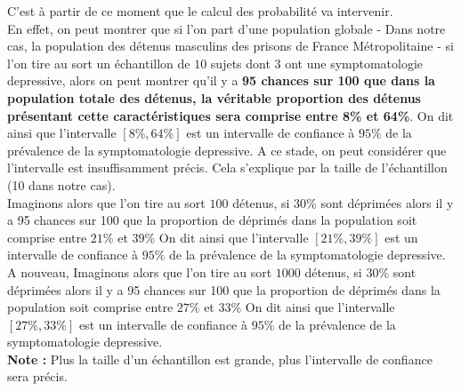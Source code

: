 C'est à partir de ce moment que le calcul des probabilité va intervenir.\newline
\\
En effet, on peut montrer que si l'on part d'une population globale - Dans notre cas, la population des détenus masculins des prisons de France Métropolitaine - si l'on tire au sort un échantillon de $10$ sujets dont $3$ ont une symptomatologie depressive, alors on peut montrer qu'il y a \textbf{95 chances sur 100 que dans la population totale des détenus, la véritable proportion des détenus présentant cette caractéristiques sera comprise entre 8\% et 64\%}.\newline
On dit ainsi que l'intervalle $[8\%,64\%]$ est un intervalle de confiance à $95\%$ de la prévalence de la symptomatologie depressive.\newline
A ce stade, on peut considérer que l'intervalle est insuffisamment précis. Cela s'explique par la taille de l'échantillon (10 dans notre cas).\newline
\\
Imaginons alors que l'on tire au sort $100$ détenus, si $30\%$ sont déprimées alors il y a 95 chances sur 100 que la proportion de déprimés dans la population soit  comprise entre $21\%$ et $39\%$\newline
On dit ainsi que l'intervalle $[21\%,39\%]$ est un intervalle de confiance à $95\%$ de la prévalence de la symptomatologie depressive.\newline
\\
A nouveau, Imaginons alors que l'on tire au sort $1000$ détenus, si $30\%$ sont déprimées alors il y a 95 chances sur 100 que la proportion de déprimés dans la population soit  comprise entre $27\%$ et $33\%$\newline
On dit ainsi que l'intervalle $[27\%,33\%]$ est un intervalle de confiance à $95\%$ de la prévalence de la symptomatologie depressive.\newline
\\
\textbf{Note : } Plus la taille d'un échantillon est grande, plus l'intervalle de confiance sera précis.\newline
\\
